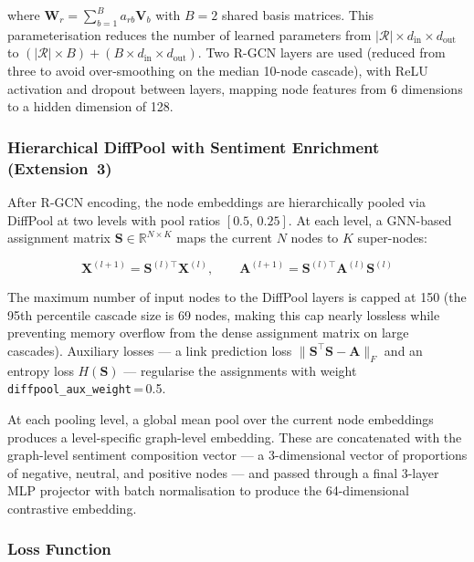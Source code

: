 \documentclass[12pt, a4paper]{article}
\begin{document}
where $\mathbf{W}_r = \sum_{b=1}^{B} a_{rb} \mathbf{V}_b$ with $B\!=\!2$ shared basis matrices. This parameterisation reduces the number of learned parameters from $|\mathcal{R}| \times d_{\text{in}} \times d_{\text{out}}$ to $(|\mathcal{R}| \times B) + (B \times d_{\text{in}} \times d_{\text{out}})$. Two R-GCN layers are used (reduced from three to avoid over-smoothing on the median 10-node cascade), with ReLU activation and dropout between layers, mapping node features from 6 dimensions to a hidden dimension of 128.

\subsubsection{Hierarchical DiffPool with Sentiment Enrichment (Extension~3)}

After R-GCN encoding, the node embeddings are hierarchically pooled via DiffPool \citep{ying2018diffpool} at two levels with pool ratios $[0.5,\,0.25]$. At each level, a GNN-based assignment matrix $\mathbf{S} \in \mathbb{R}^{N \times K}$ maps the current $N$ nodes to $K$ super-nodes:

\begin{equation}
\mathbf{X}^{(l+1)} = \mathbf{S}^{(l)\top} \mathbf{X}^{(l)}, \qquad
\mathbf{A}^{(l+1)} = \mathbf{S}^{(l)\top} \mathbf{A}^{(l)} \mathbf{S}^{(l)}
\end{equation}

The maximum number of input nodes to the DiffPool layers is capped at 150 (the 95th percentile cascade size is 69 nodes, making this cap nearly lossless while preventing memory overflow from the dense assignment matrix on large cascades). Auxiliary losses --- a link prediction loss $\|\mathbf{S}^\top \mathbf{S} - \mathbf{A}\|_F$ and an entropy loss $H(\mathbf{S})$ --- regularise the assignments with weight \texttt{diffpool\_aux\_weight}\,=\,0.5.

At each pooling level, a global mean pool over the current node embeddings produces a level-specific graph-level embedding. These are concatenated with the graph-level sentiment composition vector --- a 3-dimensional vector of proportions of negative, neutral, and positive nodes --- and passed through a final 3-layer MLP projector with batch normalisation to produce the 64-dimensional contrastive embedding.

\subsubsection{Loss Function}
\end{document}
